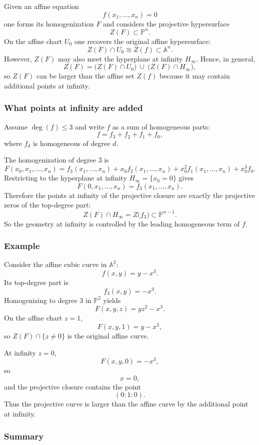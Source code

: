\documentclass[12pt,a4paper]{article}
\theoremstyle{plain}
\theoremstyle{definition}      %
\begin{document}
Given an affine equation
\[
f(x_1,\dots,x_n)=0
\]
one forms its homogenization $F$ and considers the projective hypersurface
\[
Z(F)\subset \mathbb P^n.
\]
On the affine chart $U_0$ one recovers the original affine hypersurface:
\[
Z(F)\cap U_0
\cong
Z(f)\subset \mathbb A^n.
\]
However, $Z(F)$ may also meet the hyperplane at infinity $H_\infty$.
Hence, in general,
\[
Z(F)
=
\bigl(Z(F)\cap U_0\bigr)\ \cup\ \bigl(Z(F)\cap H_\infty\bigr),
\]
so $Z(F)$ can be larger than the affine set $Z(f)$ because it may contain additional points at infinity.

\subsubsection*{What points at infinity are added}

Assume $\deg(f)\le 3$ and write $f$ as a sum of homogeneous parts:
\[
f
=
f_3+f_2+f_1+f_0,
\]
where $f_d$ is homogeneous of degree $d$.

The homogenization of degree $3$ is
\[
F(x_0,x_1,\dots,x_n)
=
f_3(x_1,\dots,x_n)
+
x_0 f_2(x_1,\dots,x_n)
+
x_0^2 f_1(x_1,\dots,x_n)
+
x_0^3 f_0.
\]
Restricting to the hyperplane at infinity $H_\infty=\{x_0=0\}$ gives
\[
F(0,x_1,\dots,x_n)
=
f_3(x_1,\dots,x_n).
\]
Therefore the points at infinity of the projective closure are exactly the projective zeros of the top-degree part:
\[
Z(F)\cap H_\infty
=
Z\bigl(f_3\bigr)\subset \mathbb P^{n-1}.
\]
So the geometry at infinity is controlled by the leading homogeneous term of $f$.

\subsubsection*{Example}

Consider the affine cubic curve in $\mathbb A^2$:
\[
f(x,y)=y-x^3.
\]
Its top-degree part is
\[
f_3(x,y)=-x^3.
\]
Homogenizing to degree $3$ in $\mathbb P^2$ yields
\[
F(x,y,z)=yz^2-x^3.
\]
On the affine chart $z=1$,
\[
F(x,y,1)=y-x^3,
\]
so $Z(F)\cap\{z\neq 0\}$ is the original affine curve.

At infinity $z=0$,
\[
F(x,y,0)=-x^3,
\]
so
\[
x=0,
\]
and the projective closure contains the point
\[
(0:1:0).
\]
Thus the projective curve is larger than the affine curve by the additional point at infinity.

\subsubsection*{Summary}
\end{document}
